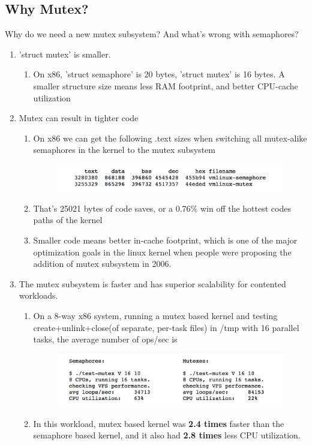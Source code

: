 \documentclass[10pt,preprint]{sigplanconf}
\begin{document}
\subsection{Why Mutex?}
Why do we need a new mutex subsystem? And what's wrong with semaphores?\\
\begin{enumerate}
	\item 'struct mutex' is smaller.
	\begin{enumerate}
		\item On x86, 'struct semaphore' is 20 bytes, 'struct mutex' is 16 bytes. A smaller structure size means less RAM footprint, and better CPU-cache utilization
	\end{enumerate}
	\item Mutex can result in tighter code
	\begin{enumerate}
		\item On x86 we can get the following .text sizes when switching all mutex-alike semaphores in the kernel to the mutex subsystem
		\begin{figure}[h!]
			\includegraphics[scale=0.5]{image00.png}
		\end{figure}
		\item That's 25021 bytes of code saves, or a 0.76\% win off the hottest codes paths of the kernel
		\item Smaller code means better in-cache footprint, which is one of the major optimization goals in the linux kernel when people were proposing the addition of mutex subsystem in 2006. 
	\end{enumerate}
	\item The mutex subsystem is faster and has superior scalability for contented workloads.
	\begin{enumerate}
		\item On a 8-way x86 system, running a mutex based kernel and testing create+unlink+close(of separate, per-task files) in /tmp with 16 parallel tasks, the average number of ops/sec is 
		\begin{figure}[h!]
			\includegraphics[scale=0.55]{image01.png}
		\end{figure}
		\item In this workload, mutex based kernel was \textbf{2.4 times} faster than the semaphore based kernel, and it also had \textbf{2.8 times} less CPU utilization. 
	\end{enumerate}
\end{enumerate}
\end{document}

